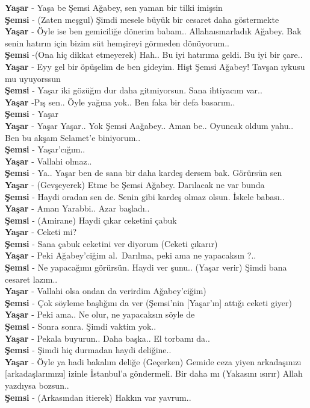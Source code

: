 \documentclass[]{book}
\begin{document}
\textbf{Yaşar} - Yaşa be Şemsi Ağabey, sen yaman bir tilki imişsin\\
\textbf{Şemsi} - (Zaten meşgul) Şimdi mesele büyük bir cesaret daha göstermekte\\
\textbf{Yaşar} - Öyle ise ben gemiciliğe dönerim babam.. Allahaısmarladık Ağabey. Bak senin hatırın için bizim süt hemşireyi görmeden dönüyorum..\\
\textbf{Şemsi} -(Ona hiç dikkat etmeyerek) Hah.. Bu iyi hatırıma geldi. Bu iyi bir çare..\\
\textbf{Yaşar} - Eyy gel bir öpüşelim de ben gideyim. Hişt Şemsi Ağabey! Tavşan ıykusu mu uyuyorssun\\
\textbf{Şemsi} - Yaşar iki gözüğm dur daha gitmiyorsun. Sana ihtiyacım var..\\
\textbf{Yaşar} -Pış sen.. Öyle yağma yok.. Ben faka bir defa basarım..\\
\textbf{Şemsi} - Yaşar\\
\textbf{Yaşar} - Yaşar Yaşar.. Yok Şemsi Aağabey.. Aman be.. Oyuncak oldum yahu.. Ben bu akşam Selamet'e biniyorum..\\
\textbf{Şemsi} - Yaşar'cığım..\\
\textbf{Yaşar} - Vallahi olmaz..\\
\textbf{Şemsi} - Ya.. Yaşar ben de sana bir daha kardeş dersem bak. Görürsün sen\\
\textbf{Yaşar} - (Gevşeyerek) Etme be Şemsi Ağabey. Darılacak ne var bunda\\
\textbf{Şemsi} - Haydi oradan sen de. Senin gibi kardeş olmaz olsun. İskele babası..\\
\textbf{Yaşar} - Aman Yarabbi.. Azar başladı..\\
\textbf{Şemsi} - (Amirane) Haydi çıkar ceketini çabuk\\
\textbf{Yaşar} - Ceketi mi?\\
\textbf{Şemsi} - Sana çabuk ceketini ver diyorum (Ceketi çıkarır)\\
\textbf{Yaşar} - Peki Ağabey'ciğim al.~Darılma, peki ama ne yapacaksın ?..\\
\textbf{Şemsi} - Ne yapacağımı görürsün. Haydi ver şunu.. (Yaşar verir) Şimdi bana cesaret lazım..\\
\textbf{Yaşar} - Vallahi olsa ondan da verirdim Ağabey'ciğim)\\
\textbf{Şemsi} - Çok söyleme başlığını da ver (Şemsi'nin {[}Yaşar'ın{]} attığı ceketi giyer)\\
\textbf{Yaşar} - Peki ama.. Ne olur, ne yapacaksın söyle de\\
\textbf{Şemsi} - Sonra sonra. Şimdi vaktim yok..\\
\textbf{Yaşar} - Pekala buyurun.. Daha başka.. El torbamı da..\\
\textbf{Şemsi} - Şimdi hiç durmadan haydi deliğine..\\
\textbf{Yaşar} - Öyle ya hadi bakalım deliğe (Geçerken) Gemide ceza yiyen arkadaşınızı {[}arkadaşlarımızı{]} izinle İstanbul'a göndermeli. Bir daha mı (Yakasını ısırır) Allah yazdıysa bozsun..\\
\textbf{Şemsi} - (Arkasından itierek) Hakkın var yavrum..\\
\end{document}
